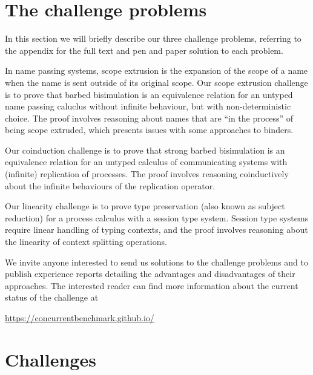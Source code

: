 \documentclass[adraft,copyright,creativecommons]{eptcs}
\begin{document}
\section{The challenge problems}
In this section we will briefly describe our three challenge problems, referring to the appendix for the full text and pen and paper solution to each problem.

In name passing systems, scope extrusion is the expansion of the scope of a name when the name is sent outside of its original scope.
Our scope extrusion challenge is to prove that barbed bisimulation is an equivalence relation for an untyped name passing caluclus without infinite behaviour, but with non-deterministic choice.
The proof involves reasoning about names that are ``in the process'' of being scope extruded, which presents issues with some approaches to binders.

Our coinduction challenge is to prove that strong barbed bisimulation is an equivalence relation for an untyped calculus of communicating systems with (infinite) replication of processes.
The proof involves reasoning coinductively about the infinite behaviours of the replication operator.

Our linearity challenge is to prove type preservation (also known as subject reduction) for a process calculus with a session type system.
Session type systems require linear handling of typing contexts, and the proof involves reasoning about the linearity of context splitting operations.

We invite anyone interested to send us solutions to the challenge problems and to publish experience reports detailing the advantages and disadvantages of their approaches.
The interested reader can find more information about the current status of the challenge at
\begin{center}
  \url{https://concurrentbenchmark.github.io/}
\end{center}




\appendix

\section{Challenges}

\end{document}
